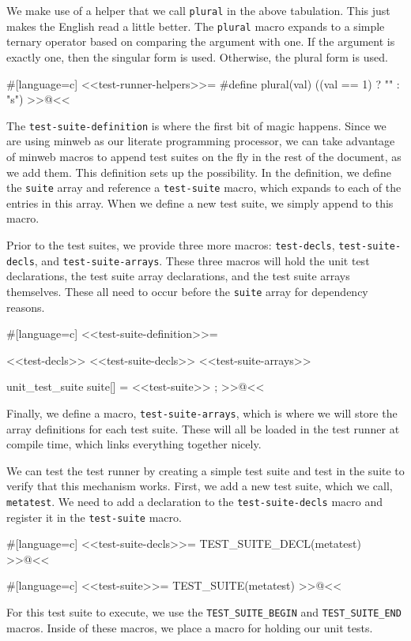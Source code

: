 We make use of a helper that we call \verb/plural/ in the above tabulation. This
just makes the English read a little better.  The \verb/plural/ macro expands to
a simple ternary operator based on comparing the argument with one. If the
argument is exactly one, then the singular form is used. Otherwise, the plural
form is used.

#[language=c]
<<test-runner-helpers>>=
#define plural(val) ((val == 1) ? "" : "s")
>>@<<

The \verb/test-suite-definition/ is where the first bit of magic happens. Since
we are using minweb as our literate programming processor, we can take advantage
of minweb macros to append test suites on the fly in the rest of the document,
as we add them.  This definition sets up the possibility.  In the definition, we
define the \verb/suite/ array and reference a \verb/test-suite/ macro, which
expands to each of the entries in this array.  When we define a new test suite,
we simply append to this macro.

Prior to the test suites, we provide three more macros: \verb/test-decls/,
\verb/test-suite-decls/, and \verb/test-suite-arrays/.  These three macros will
hold the unit test declarations, the test suite array declarations, and the test
suite arrays themselves.  These all need to occur before the \verb/suite/ array
for dependency reasons.

#[language=c]
<<test-suite-definition>>=

<<test-decls>>
<<test-suite-decls>>
<<test-suite-arrays>>

unit_test_suite suite[] =
{
    <<test-suite>>
};
>>@<<

Finally, we define a macro, \verb/test-suite-arrays/, which is where we will
store the array definitions for each test suite.  These will all be loaded in
the test runner at compile time, which links everything together nicely.

We can test the test runner by creating a simple test suite and test in the
suite to verify that this mechanism works.  First, we add a new test suite,
which we call, \verb/metatest/. We need to add a declaration to the
\verb/test-suite-decls/ macro and register it in the \verb/test-suite/ macro.

#[language=c]
<<test-suite-decls>>=
TEST_SUITE_DECL(metatest)
>>@<<

#[language=c]
<<test-suite>>=
TEST_SUITE(metatest)
>>@<<

For this test suite to execute, we use the \verb/TEST_SUITE_BEGIN/ and
\verb/TEST_SUITE_END/ macros. Inside of these macros, we place a macro for
holding our unit tests.

